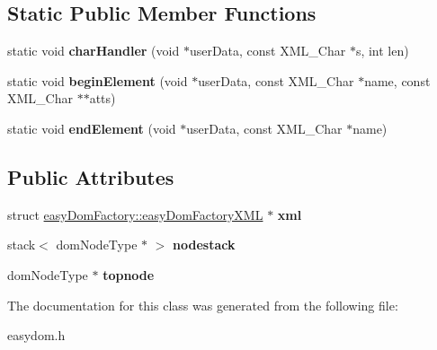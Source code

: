 \subsection*{Static Public Member Functions}
\begin{DoxyCompactItemize}
\item 
static void {\bfseries char\+Handler} (void $\ast$user\+Data, const X\+M\+L\+\_\+\+Char $\ast$s, int len)\hypertarget{classeasyDomFactory_a49fbf125db12ac26420ce190aa914da5}{}\label{classeasyDomFactory_a49fbf125db12ac26420ce190aa914da5}

\item 
static void {\bfseries begin\+Element} (void $\ast$user\+Data, const X\+M\+L\+\_\+\+Char $\ast$name, const X\+M\+L\+\_\+\+Char $\ast$$\ast$atts)\hypertarget{classeasyDomFactory_ac1c745ddee5f5cdbf238b78dd8ae6769}{}\label{classeasyDomFactory_ac1c745ddee5f5cdbf238b78dd8ae6769}

\item 
static void {\bfseries end\+Element} (void $\ast$user\+Data, const X\+M\+L\+\_\+\+Char $\ast$name)\hypertarget{classeasyDomFactory_a7537d4e6cb2e509e1f188abf9b5cb1bb}{}\label{classeasyDomFactory_a7537d4e6cb2e509e1f188abf9b5cb1bb}

\end{DoxyCompactItemize}
\subsection*{Public Attributes}
\begin{DoxyCompactItemize}
\item 
struct \hyperlink{structeasyDomFactory_1_1easyDomFactoryXML}{easy\+Dom\+Factory\+::easy\+Dom\+Factory\+X\+ML} $\ast$ {\bfseries xml}\hypertarget{classeasyDomFactory_a960bfb4852ec72f92c9759299ed8a26a}{}\label{classeasyDomFactory_a960bfb4852ec72f92c9759299ed8a26a}

\item 
stack$<$ dom\+Node\+Type $\ast$ $>$ {\bfseries nodestack}\hypertarget{classeasyDomFactory_a6117323a04bafc6d04729b1a61775a18}{}\label{classeasyDomFactory_a6117323a04bafc6d04729b1a61775a18}

\item 
dom\+Node\+Type $\ast$ {\bfseries topnode}\hypertarget{classeasyDomFactory_a2ed304f8aa44c995266abb8289ed8c70}{}\label{classeasyDomFactory_a2ed304f8aa44c995266abb8289ed8c70}

\end{DoxyCompactItemize}


The documentation for this class was generated from the following file\+:\begin{DoxyCompactItemize}
\item 
easydom.\+h\end{DoxyCompactItemize}
